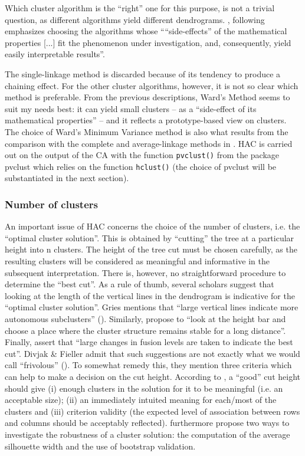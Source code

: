 Which cluster algorithm is the ``right'' one for this purpose, is not a trivial question, as different algorithms yield different dendrograms. \citet[132]{divjak_structuring_2010}, following \citet[35]{speece_cluster_1994} emphasizes choosing the algorithms whose “``side-effects'' of the mathematical properties [...] fit the phenomenon under investigation, and, consequently, yield easily interpretable results”. 

The single-linkage method is discarded because of its tendency to produce a chaining effect. For the other cluster algorithms, however, it is not so clear which method is preferable. From the previous descriptions, Ward’s Method seems to suit my needs best: it can yield small clusters – as a “side-effect of its mathematical properties” – and it reflects a prototype-based view on clusters. The choice of Ward’s Minimum Variance method is also what results from the comparison with the complete and average-linkage methods in . HAC is carried out on the output of the CA with the function \texttt{pvclust()} from the package pvclust which relies on the function \texttt{hclust()} (the choice of pvclust will be substantiated in the next section).

\subsubsection{Number of clusters}
\label{sec:3.7.2.3} 
An important issue of HAC concerns the choice of the number of clusters, i.e. the ``optimal cluster solution''. This is obtained by ``cutting'' the tree at a particular height into n clusters. The height of the tree cut must be chosen carefully, as the resulting clusters will be considered as meaningful and informative in the subsequent interpretation. There is, however, no straightforward procedure to determine the ``best cut''. As a rule of thumb, several scholars suggest that looking at the length of the vertical lines in the dendrogram is indicative for the ``optimal cluster solution''. Gries mentions that “large vertical lines indicate more autonomous subclusters” (\citeyear[338]{gries_statistics_2013}). Similarly, \citet[430]{glynn_cluster_2014} propose to “look at the height bar and choose a place where the cluster structure remains stable for a long distance”. Finally, \citet[95]{everitt_cluster_2011} assert that “large changes in fusion levels are taken to indicate the best cut”. Divjak \& Fieller admit that such suggestions are not exactly what we would call “frivolous” (\citeyear[430]{glynn_cluster_2014}). To somewhat remedy this, they mention three criteria which can help to make a decision on the cut height. According to \citet[432--433]{glynn_cluster_2014}, a ``good'' cut height should give (i) enough clusters in the solution for it to be meaningful (i.e. an acceptable size); (ii) an immediately intuited meaning for each\slash most of the clusters and (iii) criterion validity (the expected level of association between rows and columns should be acceptably reflected). \citet[432--433]{glynn_cluster_2014} furthermore propose two ways to investigate the robustness of a cluster solution: the computation of the average silhouette width and the use of bootstrap validation.


